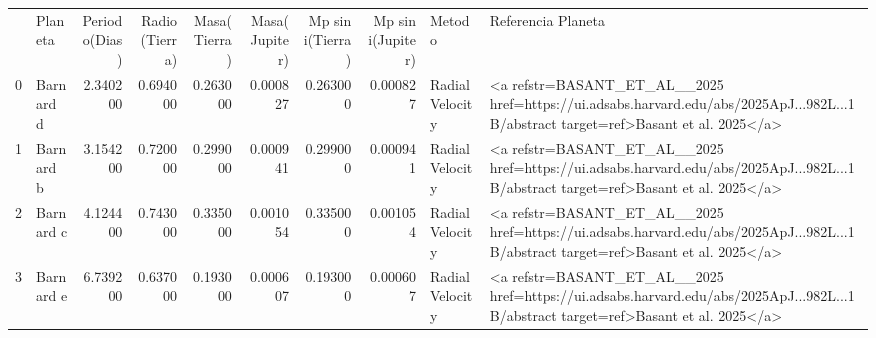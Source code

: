 \begin{tabular}{llrrrrrrll}
 & Planeta & Periodo(Dias) & Radio(Tierra) & Masa(Tierra) & Masa(Jupiter) & Mp sin i(Tierra) & Mp sin i(Jupiter) & Metodo & Referencia Planeta \\
0 & Barnard d & 2.340200 & 0.694000 & 0.263000 & 0.000827 & 0.263000 & 0.000827 & Radial Velocity & <a refstr=BASANT_ET_AL__2025 href=https://ui.adsabs.harvard.edu/abs/2025ApJ...982L...1B/abstract target=ref>Basant et al. 2025</a> \\
1 & Barnard b & 3.154200 & 0.720000 & 0.299000 & 0.000941 & 0.299000 & 0.000941 & Radial Velocity & <a refstr=BASANT_ET_AL__2025 href=https://ui.adsabs.harvard.edu/abs/2025ApJ...982L...1B/abstract target=ref>Basant et al. 2025</a> \\
2 & Barnard c & 4.124400 & 0.743000 & 0.335000 & 0.001054 & 0.335000 & 0.001054 & Radial Velocity & <a refstr=BASANT_ET_AL__2025 href=https://ui.adsabs.harvard.edu/abs/2025ApJ...982L...1B/abstract target=ref>Basant et al. 2025</a> \\
3 & Barnard e & 6.739200 & 0.637000 & 0.193000 & 0.000607 & 0.193000 & 0.000607 & Radial Velocity & <a refstr=BASANT_ET_AL__2025 href=https://ui.adsabs.harvard.edu/abs/2025ApJ...982L...1B/abstract target=ref>Basant et al. 2025</a> \\
\end{tabular}
